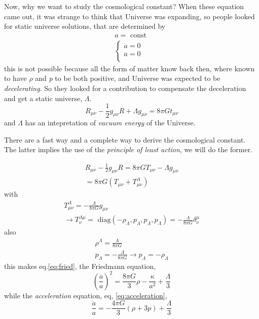 Now, why we want to study the cosmological constant? When these equation came out, it was strange to think that Universe was expanding, so people looked for static universe solutions, that are determined by
\begin{gather*}
a = \text{ const }\\
\begin{cases}
\dot{a} = 0 \\
\ddot{a} = 0 \\
\end{cases}
\end{gather*}
this is not possible because all the form of matter know back then, where known to have $\rho $ and \emph{p} to be both positive, and Universe was expected to be \emph{decelerating}. So they looked for a contribution to compensate the deceleration and get a static universe, $\Lambda $.
\[
 R_{\mu \nu } - \frac{1}{2} g_{\mu \nu }R + \Lambda g_{\mu \nu } = 8\pi Gt_{\mu \nu }
\]
and $\Lambda $ has an intepretation of \emph{vacuum energy} of the Universe.

There are a fast way and a complete way to derive the cosmological constant. The latter implies the use of the \emph{principle of least action}, we will do the former.

\begin{gather*}
R_{\mu \nu }- \frac{1}{2}g_{\mu \nu }R = 8\pi GT_{\mu \nu }- \Lambda g_{\mu \nu } \\
= 8\pi G \left( T_{\mu \nu }+ T_{\mu \nu }^{\Lambda } \right)
\end{gather*}
with 
\begin{gather*}
T^{\Lambda }_{\mu \nu } = - \frac{\Lambda }{8\pi G} g_{\mu \nu } \\
\to  T^{\Lambda \mu }_{\nu } = \text{ diag}\left( -\rho _{\Lambda }, p_{\Lambda },p_{\Lambda },p_{\Lambda } \right) = - \frac{\Lambda }{8\pi G} \delta ^{\mu }_{\nu }
\end{gather*}
also
\begin{gather*}
\rho ^{\Lambda } = \frac{\Lambda }{8\pi G} \\
p_{\Lambda } = - \frac{\Lambda }{8\pi G}
\to  p_{\Lambda } = - \rho _{\Lambda }
\end{gather*}
this makes eq.\ref{eq:fried}, the Friedmann equation,
\[
	\left( \frac{\dot{a}}{a} \right)^{2} = \frac{8\pi G}{3}\rho - \frac{\kappa }{a^{2}} + \frac{\Lambda }{3}
\]
while the \emph{acceleration} equation, eq, \ref{eq:acceleration},
\[
\frac{\ddot{a}}{a} = - \frac{4\pi G}{3}\left( \rho +3p \right) + \frac{\Lambda }{3}
\]
